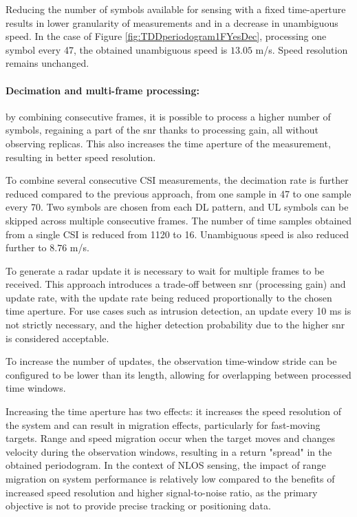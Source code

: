 		     Reducing the number of symbols available for sensing with a fixed time-aperture results in lower granularity of measurements and in a decrease in unambiguous speed. In the case of Figure \ref{fig:TDDperiodogram1FYesDec}, processing one symbol every 47, the obtained unambiguous speed is $13.05$ m/s. Speed resolution remains unchanged.
		    
		     \paragraph{Decimation and multi-frame processing:}
		     by combining consecutive frames, it is possible to process a higher number of symbols, regaining a part of the \gls{snr} thanks to processing gain, all without observing replicas. 
		     This also increases the time aperture of the measurement, resulting in better speed resolution.
		     
			 To combine several consecutive CSI measurements, the decimation rate is further reduced compared to the previous approach, from one sample in 47 to one sample every 70. 
			 Two symbols are chosen from each DL pattern, and UL symbols can be skipped across multiple consecutive frames.
			 The number of time samples obtained from a single CSI is reduced from 1120 to 16.
			 Unambiguous speed is also reduced further to $8.76$ m/s.
			 
			 To generate a radar update it is necessary to wait for multiple frames to be received.
			 This approach introduces a trade-off between \gls{snr} (processing gain) and update rate, with the update rate being reduced proportionally to the chosen time aperture.
		     For use cases such as intrusion detection, an update every 10 ms is not strictly necessary, and the higher detection probability due to the higher \gls{snr} is considered acceptable.
		          
		     To increase the number of updates, the observation time-window stride can be configured to be lower than its length, allowing for overlapping between processed time windows.
		      
		     Increasing the time aperture has two effects: it increases the speed resolution of the system and can result in migration effects, particularly for fast-moving targets. 
		     Range and speed migration occur when the target moves and changes velocity during the observation windows, resulting in a return "spread" in the obtained periodogram.
		     In the context of NLOS sensing, the impact of range migration on system performance is relatively low compared to the benefits of increased speed resolution and higher signal-to-noise ratio, as the primary objective is not to provide precise tracking or positioning data.
			
